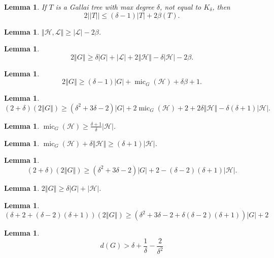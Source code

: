 \documentclass[12pt]{article}
\theoremstyle{plain}
\newtheorem{lem}[thm]{Lemma}
\theoremstyle{definition}
\theoremstyle{remark}
\newcommand{\fancy}[1]{\mathcal{#1}}
\renewcommand{\L}{\fancy{L}}
\newcommand{\HH}{\fancy{H}}
\newcommand{\card}[1]{\left|#1\right|}
\newcommand{\size}[1]{\left\Vert#1\right\Vert}
\newcommand{\mic}{\operatorname{mic}}
\begin{document}
\begin{lem}
	 If $T$ is a Gallai tree with max degree $\delta$, not equal to $K_\delta$, then
	 \[2||T|| \le (\delta - 1)|T| + 2\beta(T).\]
\end{lem}

\begin{lem}
	$\size{\HH, \L} \ge \card{\L} - 2\beta$.
\end{lem}

\begin{lem}
	\[2\size{G} \ge \delta\card{G} + \card{\L} + 2\size{\HH} - \delta\card{\HH} - 2\beta.\]
\end{lem}

\begin{lem}
	\[2\size{G} \ge (\delta-1)\card{G} + \mic_G(\HH) + \delta\beta + 1.\]
\end{lem}

\begin{lem}
	\[(2 + \delta)(2\size{G}) \ge (\delta^2 + 3\delta - 2)\card{G} + 2\mic_G(\HH) + 2 + 2\delta\size{\HH} - \delta(\delta+1)\card{\HH}.\]
\end{lem}

\begin{lem}
	$\mic_G(\HH) \ge \frac{\delta + 1}{\delta}\card{\HH}$.
\end{lem}

\begin{lem}
	$\mic_G(\HH) + \delta\size{\HH} \ge (\delta + 1)\card{\HH}$.
\end{lem}

\begin{lem}
	\[(2 + \delta)(2\size{G}) \ge (\delta^2 + 3\delta - 2)\card{G} + 2 - (\delta - 2)(\delta + 1)\card{\HH}.\]
\end{lem}

\begin{lem}
	$2\size{G} \ge \delta\card{G} + \card{\HH}$.
\end{lem}

\begin{lem}
	\[(\delta + 2 + (\delta - 2)(\delta+1))(2\size{G}) \ge (\delta^2 + 3\delta - 2 + \delta(\delta - 2)(\delta+1))\card{G} + 2\]
\end{lem}


\begin{lem}
	\[d(G) > \delta + \frac{1}{\delta} - \frac{2}{\delta^2}\]
\end{lem}





\end{document}
